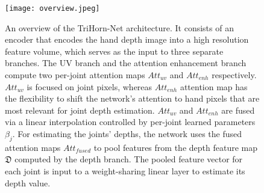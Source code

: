 \documentclass{article}
\begin{document}
\begin{figure}[t]
\centering
\texttt{[image: overview.jpeg]}
\caption{An overview of the TriHorn-Net architecture. It consists of an encoder that encodes the hand depth image into a high resolution feature volume, which serves as the input to three separate branches. The UV branch and the attention enhancement branch compute two per-joint attention maps $Att_{uv}$ and $Att_{enh}$ respectively. $Att_{uv}$ is focused on joint pixels, whereas $Att_{enh}$ attention map has the flexibility to shift the network's attention to hand pixels that are most relevant for joint depth estimation. $Att_{uv}$ and $Att_{enh}$ are fused via a linear interpolation controlled by per-joint learned parameters $\beta_j$. For estimating the joints' depths, the network uses the fused attention maps $Att_{fused}$ to pool features from the depth feature map $\mathfrak{D}$ computed by the depth branch. The pooled feature vector for each joint is input to a weight-sharing linear layer to estimate its depth value.}
\label{fig:overview_main}
\end{figure}
\end{document}
